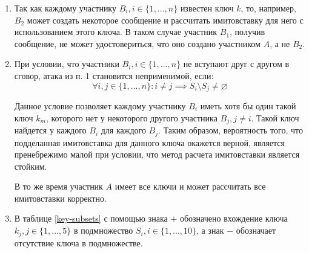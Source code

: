 \documentclass[12pt, a4paper]{extarticle}
\begin{document}
\begin{enumerate}
    \item Так как каждому участнику $B_i, i \in \{1, ..., n\}$ известен ключ $k$, то, например, 
    	$B_2$ может создать некоторое сообщение и рассчитать имитовставку для него с использованием 
    	этого ключа. В таком случае участник $B_1$, получив сообщение, не может удостовериться, что 
    	оно создано участником $A$, а не $B_2$.
        
    \item При условии, что участники $B_i, i \in \{1, ..., n\}$ не вступают друг с другом в сговор, 
    	атака из п. 1 становится неприменимой, если:
        \begin{equation}
            \forall i,j \in \{1,...,n\} : i \ne j \implies S_i \setminus S_j \ne \varnothing
            \label{6.2-condition}
        \end{equation}
        
        Данное условие позволяет каждому участнику $B_i$ иметь хотя бы один такой ключ $k_m$, 
        которого нет у некоторого другого участника $B_j, j \ne i$. Такой ключ найдется у каждого 
        $B_i$ для каждого $B_j$. Таким образом, вероятность того, что подделанная имитовставка для 
        данного ключа окажется верной, является пренебрежимо малой при условии, что метод расчета 
        имитовставки является стойким.
        
        В то же время участник $A$ имеет все ключи и может рассчитать все имитовставки корректно.
        
    \item В таблице \ref{key-subsets} с помощью знака $+$ обозначено вхождение ключа 
    	$k_j, j \in \{1, ..., 5\}$ в подмножество $S_i, i \in \{1, ..., 10\}$, а знак $-$ обозначает 
    	отсутствие ключа в подмножестве.
        

\end{enumerate}
\end{document}
